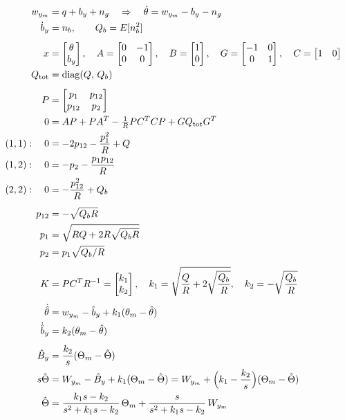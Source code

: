 \documentclass[11pt]{article}
\begin{document}
\begin{align*}
w_{y_m} &= q + b_y + n_g \quad\Rightarrow\quad \dot\theta = w_{y_m} - b_y - n_g\\
\dot b_y &= n_b, \qquad Q_b = E[n_b^2]\\[1ex]
x &= \begin{bmatrix}\theta\\ b_y\end{bmatrix},\quad
A = \begin{bmatrix}0&-1\\0&0\end{bmatrix},\quad
B = \begin{bmatrix}1\\0\end{bmatrix},\quad
G = \begin{bmatrix}-1&0\\0&1\end{bmatrix},\quad
C = \begin{bmatrix}1&0\end{bmatrix}\\
Q_{\rm tot} &= \mathrm{diag}(Q,\,Q_b)\\[1ex]
P &= \begin{bmatrix}p_1&p_{12}\\p_{12}&p_2\end{bmatrix}\\
0 &= AP + PA^T - \tfrac1R PC^TCP + GQ_{\rm tot}G^T\\
(1,1):\quad 0 &= -2p_{12} - \frac{p_1^2}{R} + Q\\
(1,2):\quad 0 &= -p_2 - \frac{p_1p_{12}}{R}\\
(2,2):\quad 0 &= -\frac{p_{12}^2}{R} + Q_b\\[1ex]
p_{12} &= -\sqrt{Q_bR}\\
p_1 &= \sqrt{RQ + 2R\sqrt{Q_bR}}\\
p_2 &= p_1\sqrt{Q_b/R}\\[1ex]
K &= PC^TR^{-1} = \begin{bmatrix}k_1\\k_2\end{bmatrix},\quad
k_1 = \sqrt{\frac{Q}{R} + 2\sqrt{\frac{Q_b}{R}}},\quad
k_2 = -\sqrt{\frac{Q_b}{R}}\\[1ex]
\dot{\hat\theta} &= w_{y_m} - \hat b_y + k_1(\theta_m - \hat\theta)\\
\dot{\hat b}_y &= k_2(\theta_m - \hat\theta)\\[1ex]
\hat B_y &= \frac{k_2}{s}(\Theta_m - \hat\Theta)\\
s\hat\Theta &= W_{y_m} - \hat B_y + k_1(\Theta_m - \hat\Theta)
= W_{y_m} + \Big(k_1 - \frac{k_2}{s}\Big)(\Theta_m - \hat\Theta)\\
\hat\Theta &= \frac{k_1 s - k_2}{s^2 + k_1 s - k_2}\,\Theta_m
+ \frac{s}{s^2 + k_1 s - k_2}\,W_{y_m}
\end{align*}
\end{document}
